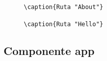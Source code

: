 \documentclass{article}
\begin{document}
  \begin{figure}[H]
    \centering
    \verb|\caption{Ruta "About"}|
  \end{figure}
  \begin{figure}[H]
    \centering
    \verb|\caption{Ruta "Hello"}|
  \end{figure}
  

  \subsection{Componente app}
  
\end{document}
